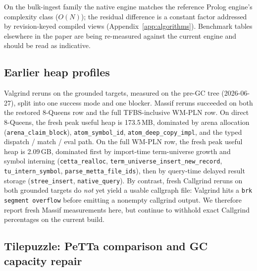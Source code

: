 \documentclass[11pt]{article}
\newcommand{\code}[1]{\texttt{#1}}
\begin{document}
On the bulk-ingest family the native engine matches the reference
Prolog engine's complexity class ($O(N)$); the residual difference is a
constant factor addressed by revision-keyed compiled views
(Appendix~\ref{app:algorithms}).  Benchmark tables elsewhere in the
paper are being re-measured against the current engine and should be
read as indicative.

\subsection{Earlier heap profiles}

Valgrind reruns on the grounded targets, measured on the pre-GC tree
(2026-06-27), split into one success
mode and one blocker.  Massif reruns succeeded on both the restored
8-Queens row and the full TFBS-inclusive WM-PLN row.  On direct
8-Queens, the fresh peak useful heap is 173.5\,MB, dominated by arena
allocation (\code{arena\_claim\_block}), \code{atom\_symbol\_id},
\code{atom\_deep\_copy\_impl}, and the typed dispatch / match / eval
path.  On the full WM-PLN row, the fresh peak useful heap is
2.09\,GB, dominated first by import-time term-universe growth and
symbol interning
(\code{cetta\_realloc}, \code{term\_universe\_insert\_new\_record},
\code{tu\_intern\_symbol}, \code{parse\_metta\_file\_ids}), then by
query-time delayed result storage
(\code{stree\_insert}, \code{native\_query}).  By contrast, fresh
Callgrind reruns on both grounded targets do \emph{not} yet yield a
usable callgraph file: Valgrind hits a \code{brk segment overflow}
before emitting a nonempty callgrind output.  We therefore report fresh
Massif measurements here, but continue to withhold exact Callgrind
percentages on the current build.

\subsection{Tilepuzzle: PeTTa comparison and GC capacity repair}
\label{sec:tilepuzzle-gc}
\end{document}
